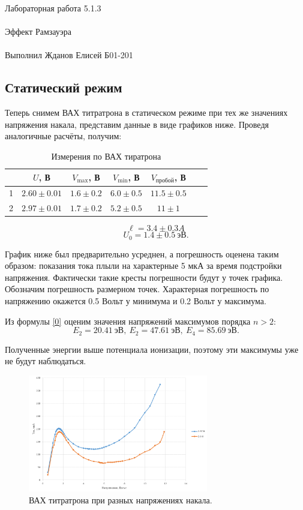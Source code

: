 \documentclass{astroedu-lab}
\begin{document}
\begin{problem}{\huge Лабораторная работа 5.1.3\\\\Эффект Рамзауэра\\\\Выполнил Жданов Елисей Б01-201}
\subsection{Статический режим}

Теперь снимем ВАХ титратрона в статическом режиме при тех же значениях напряжения накала, представим данные в виде графиков ниже. Проведя аналогичные расчёты, получим:

\begin{table}[h]
\begin{tabular}{|c|c|c|c|c|c|c|}
\hline
  & $U$, В & $V_{\text{max}}$, В & $V_{\text{min}}$, В & $V_{\text{пробой}}$, В \\ \hline
1 & $2.60  \pm  0.01$          & $1.6 \pm 0.2$                   & $6.0 \pm 0.5$                 & $11.5 \pm 0.5$                        \\ \hline
2 & $2.97   \pm 0.01$          & $1.7 \pm 0.2$                   & $5.2 \pm 0.5$                 & $11 \pm 1$                   \\ \hline
\end{tabular}
\centering
\caption{Измерения по ВАХ тиратрона}
\end{table}

\[\ell = 3.4 \pm 0.3 A\]
\[U_0 = 1.4 \pm 0.5~\text{эВ}.\]

График ниже был предварительно усреднен, а погрешность оценена таким образом: показания тока плыли на характерные 5 мкА за время подстройки напряжения. Фактически такие кресты погрешности будут у точек графика. Обозначим погрешность размерном точек. Характерная погрешность по напряжению окажется 0.5 Вольт у минимума и 0.2 Вольт у максимума.

Из формулы \eqref{0} оценим значения напряжений максимумов порядка $n > 2$:
\[E_2 = 20.41~\text{эВ},~E_2 = 47.61~\text{эВ},~E_4 = 85.69~\text{эВ}.\]

Полученные энергии выше потенциала ионизации, поэтому эти максимумы уже не будут наблюдаться.
\begin{figure}[h]
\includegraphics[width=0.7\textwidth]{граф.png}
\centering
\caption{ВАХ титратрона при разных напряжениях накала.}
\end{figure}


\end{problem}
\end{document}
